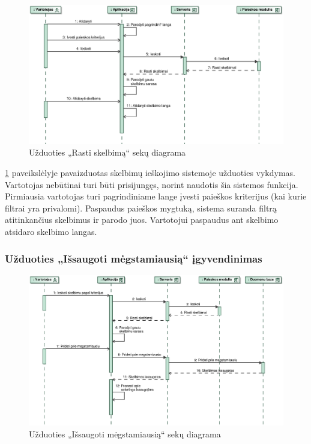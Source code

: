 \documentclass[12pt]{article}
\begin{document}
	\begin{figure}[h]
		\begin{center}
			\includegraphics[width=\textwidth]{RastiSkelbima.eps}
			\caption{Užduoties „Rasti skelbimą“ sekų diagrama\label{FindAdvertSeq}}
		\end{center}
	\end{figure}
	
	\ref{FindAdvertSeq} paveikslėlyje pavaizduotas skelbimų ieškojimo sistemoje užduoties vykdymas. Vartotojas nebūtinai turi būti prisijungęs, norint naudotis šia sistemos funkcija. Pirmiausia vartotojas turi pagrindiniame lange įvesti paieškos kriterijus (kai kurie filtrai yra privalomi). Paspaudus paieškos mygtuką, sistema suranda filtrą atitinkančius skelbimus ir parodo juos. Vartotojui paspaudus ant skelbimo atsidaro skelbimo langas.
	\pagebreak
	
	\subsubsection{Užduoties „Išsaugoti mėgstamiausią“ įgyvendinimas}
	
	\begin{figure}[h]
		\begin{center}
			\includegraphics[width=\textwidth]{IssaugotiMegstamiausia.eps}
			\caption{Užduoties „Išsaugoti mėgstamiausią“ sekų diagrama\label{SaveFavSeq}}
		\end{center}
	\end{figure}
	
\end{document}
